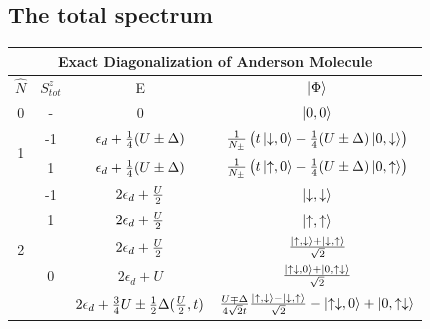 \documentclass[12pt]{article}
\begin{document}
\subsection{The total spectrum}

\begin{center}
\begin{tabular}{@{}cccc@{}}
\toprule
\multicolumn{4}{c}{\bf{Exact Diagonalization of Anderson Molecule}} \\
\toprule
\(\hat{N}\) & \(S_{tot}^z\) & E & \(\ket{\Phi}\)\\
\toprule
0 & - & 0 & \(\ket{0,0}\) \\ \toprule
\multirow{2}{*}{1} & -1 & \(\epsilon_d + \frac{1}{4}(U\pm\Delta)\)  & \(\frac{1}{N_\pm}\left({t\ket{\downarrow,0}-\frac{1}{4}(U\pm\Delta)\ket{0,\downarrow}}\right)\) \\

 \cmidrule(l){2-4}

& 1 & \(\epsilon_d + \frac{1}{4}(U\pm\Delta)\)  & \(\frac{1}{N_\pm}\left({t\ket{\uparrow,0}-\frac{1}{4}(U\pm\Delta)\ket{0,\uparrow}}\right)\) \\
 \toprule

\multirow{6}{*}{2}                     & -1                  & \(2\epsilon_d+\frac{U}{2}\)   & \(\ket{\downarrow,\downarrow}\)  \\
 \cmidrule(l){2-4} 
                                       & 1                   & \(2\epsilon_d+\frac{U}{2}\)   & \(\ket{\uparrow,\uparrow}\) \\
                                       \cmidrule(l){2-4} 
                                       & \multirow{3}{*}{0}  & \(2\epsilon_d+\frac{U}{2}\)   & \(\frac{\ket{\uparrow,\downarrow}+\ket{\downarrow,\uparrow}}{\sqrt{2}}\)  \\
                                        \cmidrule(l){3-4} 

                                       &                     & \(2\epsilon_d+U\)  & \(\frac{\ket{\uparrow\downarrow,0}+\ket{0,\uparrow\downarrow}}{\sqrt{2}}\)  \\
                                        \cmidrule(l){3-4} 

                                       &                     & \(2\epsilon_d+\frac{3}{4}U\pm\frac{1}{2}\Delta(\frac{U}{2},t)\)    & \(\frac{U\mp\Delta}{4\sqrt{2}t}\frac{\ket{\uparrow,\downarrow} - \ket{\downarrow,\uparrow}}{\sqrt 2}-\ket{\uparrow\downarrow,0} + \ket{0,\uparrow\downarrow}\)  \\
                                     
                                        \toprule


\end{tabular}
\end{center}
\end{document}
